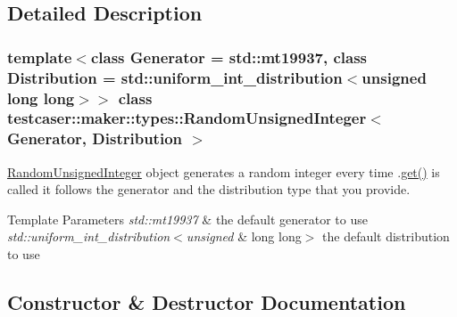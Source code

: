 \subsection{Detailed Description}
\subsubsection*{template$<$class Generator = std\+::mt19937, class Distribution = std\+::uniform\+\_\+int\+\_\+distribution$<$unsigned long long$>$$>$\newline
class testcaser\+::maker\+::types\+::\+Random\+Unsigned\+Integer$<$ Generator, Distribution $>$}

\mbox{\hyperlink{classtestcaser_1_1maker_1_1types_1_1RandomUnsignedInteger}{Random\+Unsigned\+Integer}} object generates a random integer every time .\mbox{\hyperlink{classtestcaser_1_1maker_1_1types_1_1RandomUnsignedInteger_a73504939f740445d56b0bd00257f5480}{get()}} is called it follows the generator and the distribution type that you provide. 


\begin{DoxyTemplParams}{Template Parameters}
{\em std\+::mt19937} & the default generator to use \\
\hline
{\em std\+::uniform\+\_\+int\+\_\+distribution$<$unsigned} & long long$>$ the default distribution to use \\
\hline
\end{DoxyTemplParams}


\subsection{Constructor \& Destructor Documentation}
\mbox{\label{classtestcaser_1_1maker_1_1types_1_1RandomUnsignedInteger_ad137a635f13a3b61529355643de3874f}} 
